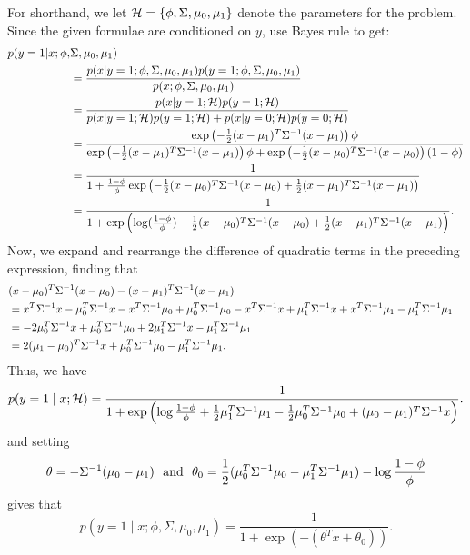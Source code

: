 \begin{answer}
	For shorthand, we let $\mathcal{H} = \{\phi, \Sigma, \mu_{0}, \mu_1\}$ denote
	the parameters for the problem.
	Since the given formulae are conditioned on $y$, use Bayes rule to get:
	\begin{align*}
		p(y =1| x ; \phi, & \Sigma, \mu_{0}, \mu_1)\\
		& = \frac {p(x|y=1; \phi, \Sigma, \mu_{0}, \mu_1) p(y=1; \phi, \Sigma,
			\mu_{0}, \mu_1)} {p(x; \phi, \Sigma, \mu_{0}, \mu_1)}
			\notag\\
		& = \frac {p(x|y=1; \mathcal{H}) p(y=1; \mathcal{H})}
			{p(x|y=1; \mathcal{H}) p(y=1; \mathcal{H}) + p(x|y={0}; \mathcal{H}) p(y={0};
			\mathcal{H})}\notag\\
		&= \frac{\exp\left(-\frac{1}{2} (x-\mu_1)^T \Sigma^{-1} (x-\mu_1) \right)
			\phi}
			{\exp\left(-\frac{1}{2} (x-\mu_1)^T \Sigma^{-1} (x-\mu_1) \right)
			\phi + \exp\left(-\frac{1}{2} (x-\mu_{0})^T \Sigma^{-1} (x-\mu_{0}) \right)
			(1-\phi)}\notag\\
		&= \frac{1} {1+ \frac{1-\phi}{\phi}
			\exp\left(-\frac{1}{2} (x-\mu_{0})^T \Sigma^{-1} (x-\mu_{0}) + \frac{1}{2}
			(x-\mu_1)^T \Sigma^{-1} (x-\mu_1)\right)}\notag\\
		&= \frac{1} {1 +\exp\left(\log(\frac{1-\phi}{\phi}) -
			\frac{1}{2}(x-\mu_{0})^T \Sigma^{-1} (x-\mu_{0}) + \frac{1}{2}(x-\mu_1)^T
			\Sigma^{-1} (x-\mu_1)\right)}.
	\end{align*}
	Now, we expand and rearrange the difference of quadratic terms
	in the preceding expression, finding that
	\begin{align*}
		\lefteqn{(x-\mu_{0})^T \Sigma^{-1} (x-\mu_{0}) - (x-\mu_1)^T
		\Sigma^{-1} (x-\mu_1)} \\
		& =  x^T \Sigma^{-1} x - \mu_{0}^T\Sigma^{-1} x -
			x^T\Sigma^{-1}\mu_{0} + \mu_{0}^T \Sigma^{-1} \mu_{0} - x^T \Sigma^{-1} x +
			\mu_1^T \Sigma^{-1} x + x^T\Sigma^{-1}\mu_1 - \mu_1^T \Sigma^{-1}
			\mu_1 \\
		& = - 2 \mu_{0}^T\Sigma^{-1} x
			+ \mu_{0}^T \Sigma^{-1} \mu_{0} + 2 \mu_1^T \Sigma^{-1} x
			- \mu_1^T \Sigma^{-1}\mu_1 \\
		& = 2 (\mu_1 - \mu_{0})^T \Sigma^{-1} x + \mu_{0}^T \Sigma^{-1} \mu_{0}
			- \mu_1^T \Sigma^{-1} \mu_1.
	\end{align*}
	Thus, we have
	\begin{equation*}
		p(y = 1 \mid x; \mathcal{H})
		= \frac{1}{1 + \exp\left(\log \frac{1 - \phi}{\phi}
		+ \frac{1}{2} \mu_1^T \Sigma^{-1} \mu_1 - \frac{1}{2} \mu_{0}^T \Sigma^{-1} \mu_{0}
		+ (\mu_{0} - \mu_1)^T \Sigma^{-1} x \right)}.
	\end{equation*}
	and setting
	\begin{equation*}
		\theta = -\Sigma^{-1}(\mu_{0} - \mu_1)
			~~ \mbox{and} ~~ \theta_0 = \frac{1}{2} (\mu_{0}^T \Sigma^{-1} \mu_{0}
			- \mu_1^T \Sigma^{-1} \mu_1) - \log \frac{1 - \phi}{\phi}
	\end{equation*}
	gives that
	\begin{equation*}
	p(y = 1 \mid x; \phi, \Sigma, \mu_{0}, \mu_1)
	= \frac{1}{1 + \exp(-(\theta^T x + \theta_0))}.
	\end{equation*}
\end{answer}

